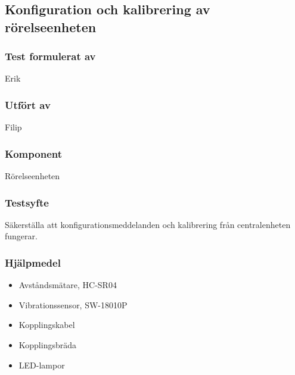 \clearpage
\subsection{Konfiguration och kalibrering av rörelseenheten}
\label{test:UrkopplingMotion}

\setlength{\columnsep}{1cm}




\begin{multicols}{2}
\subsubsection*{Test formulerat av}
Erik

\subsubsection*{Utfört av}
Filip


\end{multicols}
\subsubsection*{Komponent}
Rörelseenheten


\subsubsection*{Testsyfte}
Säkerställa att konfigurationsmeddelanden och kalibrering från centralenheten fungerar.

\subsubsection*{Hjälpmedel}
\begin{itemize}
	\item Avståndsmätare, HC-SR04
	\item Vibrationssensor, SW-18010P
	\item Kopplingskabel
	\item Kopplingsbräda
	\item LED-lampor
\end{itemize}



